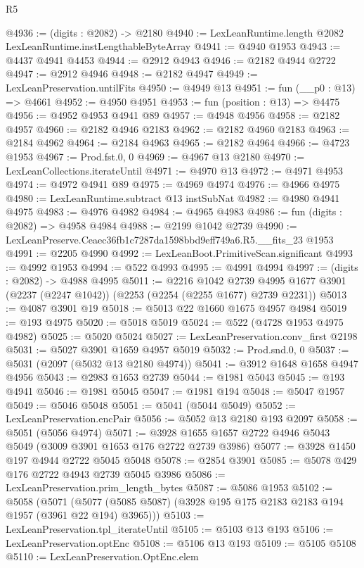 \begin{lexlean}{R5}
\begin{coremodule}
@4936 := (digits : @2082) -> @2180
@4940 := LexLeanRuntime.length @2082 LexLeanRuntime.instLengthableByteArray
@4941 := @4940 @1953
@4943 := @4437 @4941 @4453
@4944 := @2912 @4943
@4946 := @2182 @4944 @2722
@4947 := @2912 @4946
@4948 := @2182 @4947
@4949 := LexLeanPreservation.untilFits
@4950 := @4949 @13
@4951 := fun (__p0 : @13) => @4661
@4952 := @4950 @4951
@4953 := fun (position : @13) => @4475
@4956 := @4952 @4953 @4941 @89
@4957 := @4948 @4956
@4958 := @2182 @4957
@4960 := @2182 @4946 @2183
@4962 := @2182 @4960 @2183
@4963 := @2184 @4962
@4964 := @2184 @4963
@4965 := @2182 @4964
@4966 := @4723 @1953
@4967 := Prod.fst.{0, 0}
@4969 := @4967 @13 @2180
@4970 := LexLeanCollections.iterateUntil
@4971 := @4970 @13
@4972 := @4971 @4953
@4974 := @4972 @4941 @89
@4975 := @4969 @4974
@4976 := @4966 @4975
@4980 := LexLeanRuntime.subtract @13 instSubNat
@4982 := @4980 @4941 @4975
@4983 := @4976 @4982
@4984 := @4965 @4983
@4986 := fun (digits : @2082) => @4958 @4984
@4988 := @2199 @1042 @2739
@4990 := LexLeanPreserve.Ceaec36fb1c7287da1598bbd9eff749a6.R5.__fits_23 @1953
@4991 := @2205 @4990
@4992 := LexLeanBoot.PrimitiveScan.significant
@4993 := @4992 @1953
@4994 := @522 @4993
@4995 := @4991 @4994
@4997 := (digits : @2082) -> @4988 @4995
@5011 := @2216
    @1042
    @2739
    @4995
    @1677
    @3901
    (@2237 (@2247 @1042))
    (@2253 (@2254 (@2255 @1677) @2739 @2231))
@5013 := @4087 @3901 @19
@5018 := @5013 @22 @1660 @1675 @4957 @4984
@5019 := @193 @4975
@5020 := @5018 @5019
@5024 := @522 (@4728 @1953 @4975 @4982)
@5025 := @5020 @5024
@5027 := LexLeanPreservation.conv_first @2198
@5031 := @5027 @3901 @1659 @4957 @5019
@5032 := Prod.snd.{0, 0}
@5037 := @5031 (@2097 (@5032 @13 @2180 @4974))
@5041 := @3912 @1648 @1658 @4947 @4956
@5043 := @2983 @1653 @2739
@5044 := @1981 @5043
@5045 := @193 @4941
@5046 := @1981 @5045
@5047 := @1981 @194
@5048 := @5047 @1957
@5049 := @5046 @5048
@5051 := @5041 (@5044 @5049)
@5052 := LexLeanPreservation.encPair
@5056 := @5052 @13 @2180 @193 @2097
@5058 := @5051 (@5056 @4974)
@5071 := @3928 @1655 @1657 @2722 @4946 @5043 @5049 (@3009 @3901 @1653 @176 @2722 @2739 @3986)
@5077 := @3928 @1450 @197 @4944 @2722 @5045 @5048
@5078 := @2854 @3901
@5085 := @5078 @429 @176 @2722 @4943 @2739 @5045 @3986
@5086 := LexLeanPreservation.prim_length_bytes
@5087 := @5086 @1953
@5102 := @5058
    (@5071 (@5077 (@5085 @5087) (@3928 @195 @175 @2183 @2183 @194 @1957 (@3961 @22 @194) @3965)))
@5103 := LexLeanPreservation.tpl_iterateUntil
@5105 := @5103 @13 @193
@5106 := LexLeanPreservation.optEnc
@5108 := @5106 @13 @193
@5109 := @5105 @5108
@5110 := LexLeanPreservation.OptEnc.elem

\end{coremodule}
\end{lexlean}
